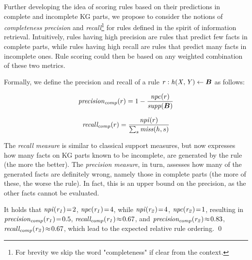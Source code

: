  Further developing the idea of scoring rules based on their predictions in complete and incomplete KG parts, we propose to consider the notions of  \emph{completeness precision} and \emph{recall}\footnote{For brevity we skip the word "completeness" if clear from the context.} for rules defined in the spirit of information retrieval. Intuitively, rules having high precision are rules that predict few facts in complete parts, while rules having high recall are rules that predict many facts in incomplete ones. Rule scoring could then be based on any weighted combination of these two metrics.

Formally, we define the precision and recall of a rule $\mi{r: h(X,Y)\leftarrow \vec{B}}$ as follows:

\begin{equation}\label{eq:precision}
\mi{precision_{comp}}(r)=1-\frac{\mi{npc}(r)}{\mi{supp}(\vec{B})}
\end{equation}

\begin{equation}\label{eq:recall}
\mathit{recall_{comp}}(r)=\frac{\mathit{npi}(r)}{\sum_s \mathit{miss}(h,s)}
\end{equation}

The \emph{recall measure} is similar to classical support measures, but now expresses how many facts on KG parts known to be incomplete, are generated by the rule (the more the better). The \emph{precision measure}, in turn, assesses how many of the generated facts are definitely wrong, namely those in complete parts (the more of these, the worse the rule). In fact, this is an upper bound on the precision, as the other facts cannot be evaluated.

\begin{example}
\label{ex:prec_recall}
It holds that $\mathit{npi(r_1)}\!=\!2$, %
$\mathit{npc(r_1)}\!=\!4$, %
while $\mathit{npi(r_2)}\!=\!4$, $\mathit{npc(r_2)}\!=\!1$, resulting in $\mathit{precision_{comp}(r_1)}\!=\!0.5$, 
$\mathit{recall_{comp}(r_1)}\!\approx\!0.67$, %
and $\mathit{precision_{comp}(r_2)}\!\approx\!0.83$, $\mathit{recall_{comp}(r_2)}\!\approx\!0.67$, which lead to the expected relative rule ordering. \qed
\end{example}

